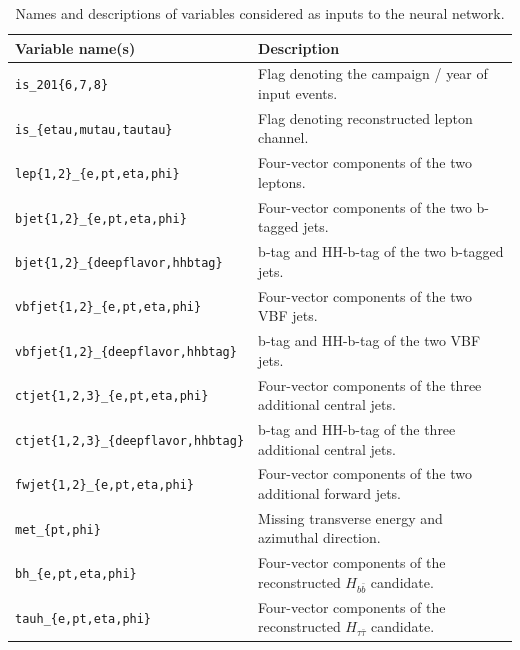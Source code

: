 \documentclass[../main.tex]{subfiles}
\begin{document}
\begin{table}[h!]
    \centering
    \footnotesize
      \begin{tabular}{|l|l|}
        \hline
        Variable name(s)                               & Description                                                                 \\
        \hline
        \texttt{is\_201\{6,7,8\}}                      & Flag denoting the campaign / year of input events.                          \\
        \texttt{is\_\{etau,mutau,tautau\}}             & Flag denoting reconstructed lepton channel.                                 \\
        \texttt{lep\{1,2\}\_\{e,pt,eta,phi\}}          & Four-vector components of the two leptons.                                  \\
        \texttt{bjet\{1,2\}\_\{e,pt,eta,phi\}}         & Four-vector components of the two b-tagged jets.                            \\
        \texttt{bjet\{1,2\}\_\{deepflavor,hhbtag\}}    & b-tag and HH-b-tag of the two b-tagged jets.                                \\
        \texttt{vbfjet\{1,2\}\_\{e,pt,eta,phi\}}       & Four-vector components of the two VBF jets.                                 \\
        \texttt{vbfjet\{1,2\}\_\{deepflavor,hhbtag\}}  & b-tag and HH-b-tag of the two VBF jets.                                     \\
        \texttt{ctjet\{1,2,3\}\_\{e,pt,eta,phi\}}      & Four-vector components of the three additional central jets.                \\
        \texttt{ctjet\{1,2,3\}\_\{deepflavor,hhbtag\}} & b-tag and HH-b-tag of the three additional central jets.                    \\
        \texttt{fwjet\{1,2\}\_\{e,pt,eta,phi\}}        & Four-vector components of the two additional forward jets.                  \\
        \texttt{met\_\{pt,phi\}}                       & Missing transverse energy and azimuthal direction.                          \\
        \texttt{bh\_\{e,pt,eta,phi\}}                  & Four-vector components of the reconstructed $H_{b\bar{b}}$ candidate.       \\
        \texttt{tauh\_\{e,pt,eta,phi\}}                & Four-vector components of the reconstructed $H_{\tau\bar{\tau}}$ candidate. \\
        \hline
      \end{tabular}
     \caption{Names and descriptions of variables considered as inputs to the neural network.}
    \label{hh:fig:multi_variables}
\end{table}
\end{document}

